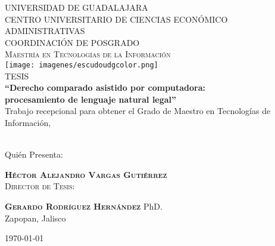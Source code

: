 \documentclass[12pt]{article}
\begin{document}
	\begin{titlepage}
		
		\newcommand{\HRule}{\rule{\linewidth}{0.5mm}}
		
		\center
		
		\textsc{ UNIVERSIDAD DE GUADALAJARA }\\%
		\textsc{ CENTRO UNIVERSITARIO DE CIENCIAS ECONÓMICO ADMINISTRATIVAS}\\[0.5cm]		
		\textsc{ COORDINACIÓN DE POSGRADO}\\%
		\textsc{ Maestría en Tecnologías de la Información }\\[0.5cm] %
		
		\texttt{[image: imagenes/escudoudgcolor.png]}\\[0.5cm]
		
		\textsc{ TESIS }\\[0.5cm] %
		
		
		{\bfseries ``Derecho comparado asistido por computadora: \\
		procesamiento de lenguaje natural legal''}\\[0.5cm]
		
		
		Trabajo recepcional para obtener el Grado de Maestro en Tecnologías de Información,\\\
		
		Quién Presenta:
		
		\textsc{\bfseries Héctor Alejandro Vargas Gutiérrez} \\
		
		
		\textsc{ Director de Tesis: }							
		
		 \textsc{\bfseries Gerardo Rodríguez Hernández} PhD.\\[0.4cm]
		 
		 Zapopan, Jalisco
		
		{\large \today} %
		
		\vfill %
	\end{titlepage}
	\newpage
	
\end{document}
